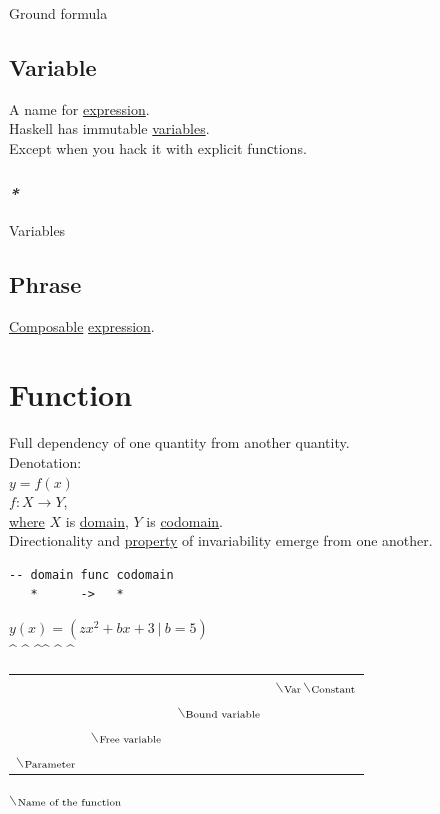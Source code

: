 \documentclass[a4paper,14pt,oneside]{book}
\begin{document}
\label{orgf9ddf9f}Ground formula\\

\section{\label{org3867557}Variable}
\label{sec:org054ce29}
A name for \hyperref[orgc25ca10]{expression}.\\

Haskell has immutable \hyperref[org03ce465]{variables}.\\
Except when you hack it with explicit funсtions.\\

\subsection{\emph{*}}
\label{sec:orga0826f1}

\label{org03ce465}Variables\\

\section{\label{orge88403c}Phrase}
\label{sec:org4274241}
\hyperref[orgeb1e07f]{Composable} \hyperref[orgc25ca10]{expression}.\\

\chapter{\label{orgee59a2b}Function}
\label{sec:orgff21acf}
Full dependency of one quantity from another quantity.\\

Denotation:\\
\(y = f(x)\)\\
\(f: X \to Y\),\\
\hyperref[org514c9de]{where} \(X\) is \hyperref[orgf3eb62c]{domain}, \(Y\) is \hyperref[orgfd5bb2d]{codomain}.\\

Directionality and \hyperref[orgfdc5558]{property} of invariability emerge from one another.\\
\begin{verbatim}
-- domain func codomain
   *      ->   *
\end{verbatim}

\(y(x) = (zx^{2} + bx + 3 \ | \ b = 5)\)\\
\^{} \^{}    \^{}\^{}    \^{}   \^{}\\
\begin{center}
\begin{tabular}{llll}
 &  &  & $\backslash$\(\textsubscript{Var}\)$\backslash$\(\textsubscript{Constant}\)\\
 &  & $\backslash$\(\textsubscript{Bound variable}\)\\
 & $\backslash$\(\textsubscript{Free variable}\)\\
$\backslash$\(\textsubscript{Parameter}\)\\
\end{tabular}
\end{center}
$\backslash$\(\textsubscript{Name of the function}\)\\
\end{document}
